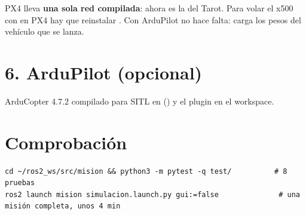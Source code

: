 \begin{aviso}
PX4 lleva \textbf{una sola red compilada}: ahora es la del Tarot. Para volar el x500 con
 en PX4 hay que reinstalar . Con ArduPilot no
hace falta:  carga los pesos del vehículo que se lanza.
\end{aviso}

\section{6. ArduPilot (opcional)}

ArduCopter 4.7.2 compilado para SITL en  () y el plugin  en el workspace.

\section{Comprobación}

\begin{lstlisting}[style=bash]
cd ~/ros2_ws/src/mision && python3 -m pytest -q test/          # 8 pruebas
ros2 launch mision simulacion.launch.py gui:=false              # una misión completa, unos 4 min
\end{lstlisting}
